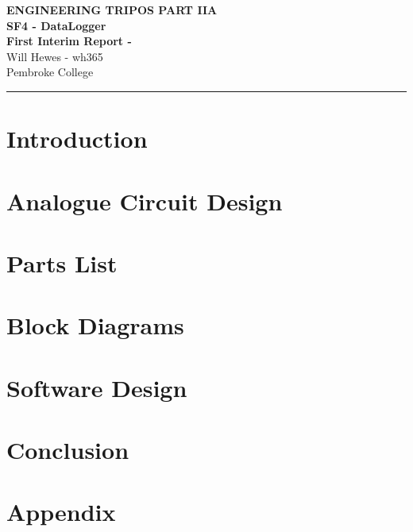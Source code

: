 \documentclass[a4paper,11pt]{article}
\renewcommand{\maketitle}{
    \begin{center}
        \LARGE \textbf{ENGINEERING TRIPOS PART IIA} \\ 
        \vspace{0.5em}
        \Large \textbf{SF4 - DataLogger} \\ 
        \vspace{0.5em}
        \textbf{First Interim Report - } \\
        \vspace{1em}
        \large Will Hewes - wh365 \\ 
        Pembroke College \\ 
        \vspace{0.5em}
    \end{center}
}
\begin{document}
\maketitle
\hrule
\tableofcontents
\newpage

\section{Introduction}
\label{sec:Introduction}

\section{Analogue Circuit Design}
\label{sec:Analogue_Circuit_Design}

\section{Parts List}
\label{sec:Parts_List}

\section{Block Diagrams}
\label{sec:Block_Diagrams}

\section{Software Design}
\label{sec:Software_Design}

\section{Conclusion}
\label{sec:Conclusion}

\appendix
\section{Appendix}
\end{document}
